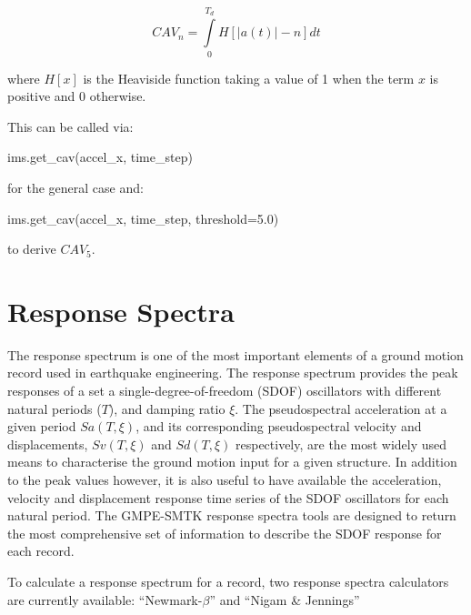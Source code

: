 \begin{equation}
CAV_n = \int\limits_0^{T_d} H\left[ {|a \left( t \right)| - n} \right] dt
\end{equation}

\noindent where $H\left[ x \right]$ is the Heaviside function taking a value of 1 when the term $x$ is positive and 0 otherwise.

This can be called via:

\begin{python}
ims.get_cav(accel_x, time_step)
\end{python}

\noindent for the general case and:

\begin{python}
ims.get_cav(accel_x, time_step, threshold=5.0)
\end{python}

to derive $CAV_5$.

\section{Response Spectra}
\label{sec:response_spectra}

The response spectrum is one of the most important elements of a ground motion record used in earthquake engineering. The response spectrum provides the peak responses of a set a single-degree-of-freedom (SDOF) oscillators with different natural periods ($T$), and damping ratio $\xi$. The pseudospectral acceleration at a given period $Sa \left({T, \xi} \right)$, and its corresponding pseudospectral velocity and displacements, $Sv \left( {T, \xi} \right)$ and $Sd \left( {T, \xi} \right)$ respectively, are the most widely used means to characterise the ground motion input for a given structure. In addition to the peak values however, it is also useful to have available the acceleration, velocity and displacement response time series of the SDOF oscillators for each natural period. The GMPE-SMTK response spectra tools are designed to return the most comprehensive set of information to describe the SDOF response for each record.

To calculate a response spectrum for a record, two response spectra calculators are currently available: ``Newmark-$\beta$'' and ``Nigam \& Jennings'' \parencite{NigamJennings1969}

